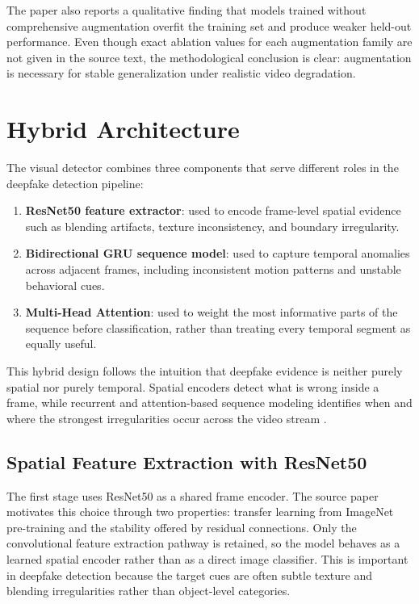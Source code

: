 The paper also reports a qualitative finding that models trained without comprehensive augmentation overfit the training set and produce weaker held-out performance. Even though exact ablation values for each augmentation family are not given in the source text, the methodological conclusion is clear: augmentation is necessary for stable generalization under realistic video degradation.

\section{Hybrid Architecture}

The visual detector combines three components that serve different roles in the deepfake detection pipeline:
\begin{enumerate}[label=\arabic*.]
    \item \textbf{ResNet50 feature extractor}: used to encode frame-level spatial evidence such as blending artifacts, texture inconsistency, and boundary irregularity.
    \item \textbf{Bidirectional GRU sequence model}: used to capture temporal anomalies across adjacent frames, including inconsistent motion patterns and unstable behavioral cues.
    \item \textbf{Multi-Head Attention}: used to weight the most informative parts of the sequence before classification, rather than treating every temporal segment as equally useful.
\end{enumerate}

This hybrid design follows the intuition that deepfake evidence is neither purely spatial nor purely temporal. Spatial encoders detect what is wrong inside a frame, while recurrent and attention-based sequence modeling identifies when and where the strongest irregularities occur across the video stream \cite{antad2024hybrid,dey2017gru}.

\subsection{Spatial Feature Extraction with ResNet50}

The first stage uses ResNet50 as a shared frame encoder. The source paper motivates this choice through two properties: transfer learning from ImageNet pre-training and the stability offered by residual connections. Only the convolutional feature extraction pathway is retained, so the model behaves as a learned spatial encoder rather than as a direct image classifier. This is important in deepfake detection because the target cues are often subtle texture and blending irregularities rather than object-level categories.


